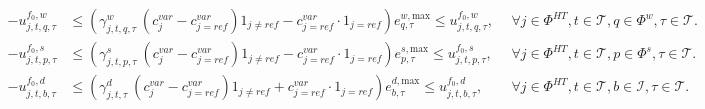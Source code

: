 \begin{align}
-u_{j, t, q, \tau}^{f_0, w} & \le \left ( \gamma_{j,t,q,\tau}^{w} \: \left ( c^{var}_{j} - c^{var}_{j=ref} \right ) 1_{j\neq{ref}} - c^{var}_{j=ref}\cdot{}1_{j=ref} \right ) e_{q,\tau}^{w, \text{max}} \le u_{j, t, q,\tau}^{f_0, w}, \ \ & \forall j \in \Phi^{HT}, t \in \mathcal{T}, q \in \Phi^{w}, \tau \in \mathcal{T}.\\
-u_{j, t, p, \tau}^{f_0, s} & \le \left ( \gamma_{j,t,p,\tau}^{s} \: \left ( c^{var}_{j} - c^{var}_{j=ref} \right ) 1_{j\neq{ref}} - c^{var}_{j=ref}\cdot{}1_{j=ref}\right ) e_{p,\tau}^{s, \text{max}} \le u_{j, t, p, \tau}^{f_0, s}, \ \ & \forall j \in \Phi^{HT}, t \in \mathcal{T}, p \in \Phi^{s}, \tau \in \mathcal{T}. \\
-u_{j, t, b,\tau}^{f_0, d} & \le \left ( \gamma_{j,t,\tau}^{d} \: \left ( c^{var}_{j} - c^{var}_{j=ref} \right ) 1_{j\neq{ref}} + c^{var}_{j=ref}\cdot{}1_{j=ref} \right ) e_{b,\tau}^{d, \text{max}} \le u_{j, t, b, \tau}^{f_0, d}, \ \ & \forall j \in \Phi^{HT}, t \in \mathcal{T}, b \in \mathcal{I}, \tau \in \mathcal{T}.
\end{align}